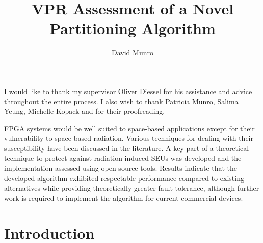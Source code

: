\documentclass[12pt,final,oneside]{dwThesis} %
\title{VPR Assessment of a Novel Partitioning Algorithm}
\author{David Munro}
\begin{document}
   \maketitle

   \begin{acknowledgements}
      I would like to thank my supervisor Oliver Diessel
      for his assistance and advice throughout the entire process. I also wish
      to thank Patricia Munro, Salima Yeung, Michelle Kopack and  for their proofreading.


   \end{acknowledgements}

   \begin{abstracts}
      \gls{FPGA} systems would be well
      suited to space-based applications except for their vulnerability to
      space-based radiation. Various techniques for dealing with their
      susceptibility have been discussed in the literature.
      A key part of a theoretical technique to protect against radiation-induced \glspl{SEU}
      was developed and the implementation assessed using open-source tools.
      Results indicate that the developed algorithm exhibited respectable performance compared
      to existing alternatives while providing theoretically greater fault tolerance, although further work is required to implement 
      the algorithm for current commercial devices.
      
      
   \end{abstracts}
   \newpage \tableofcontents*
   \listoftables
   \listoffigures
   \listoffixmes \newpage \printglossaries 

   \glsresetall
   \chapter{Introduction}
\end{document}
